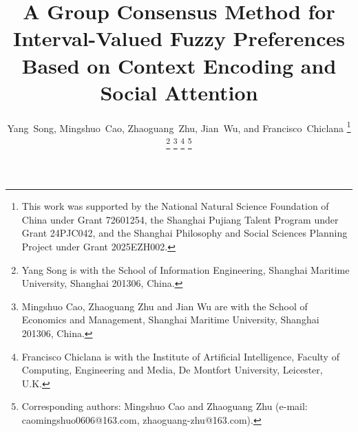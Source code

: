 \documentclass[journal]{IEEEtran}
\begin{document}
\title{A Group Consensus Method for Interval-Valued Fuzzy Preferences Based on Context Encoding and Social Attention}

\author{Yang~Song, Mingshuo~Cao, Zhaoguang~Zhu, Jian~Wu, and Francisco~Chiclana%
\thanks{This work was supported by the National Natural Science Foundation of China under Grant 72601254, the Shanghai Pujiang Talent Program under Grant 24PJC042, and the Shanghai Philosophy and Social Sciences Planning Project under Grant 2025EZH002.}%
\thanks{Yang Song is with the School of Information Engineering, Shanghai Maritime University, Shanghai 201306, China.}%
\thanks{Mingshuo Cao, Zhaoguang Zhu and Jian Wu are with the School of Economics and Management, Shanghai Maritime University, Shanghai 201306, China.}%
\thanks{Francisco Chiclana is with the Institute of Artificial Intelligence, Faculty of Computing, Engineering and Media, De Montfort University, Leicester, U.K.}%
\thanks{Corresponding authors: Mingshuo Cao and Zhaoguang Zhu (e-mail: caomingshuo0606@163.com, zhaoguang-zhu@163.com).}}


\maketitle
\end{document}
